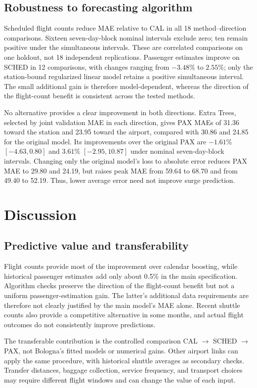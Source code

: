 \documentclass[preprint,12pt,times]{elsarticle}
\begin{document}
\subsection{Robustness to forecasting algorithm}
\label{sec:algorithm_results}
Scheduled flight counts reduce MAE relative to CAL in all 18 method--direction comparisons. Sixteen seven-day-block nominal intervals exclude zero; ten remain positive under the simultaneous intervals. These are correlated comparisons on one holdout, not 18 independent replications. Passenger estimates improve on SCHED in 12 comparisons, with changes ranging from $-3.48$\% to $2.55$\%; only the station-bound regularized linear model retains a positive simultaneous interval. The small additional gain is therefore model-dependent, whereas the direction of the flight-count benefit is consistent across the tested methods.

No alternative provides a clear improvement in both directions. Extra Trees, selected by joint validation MAE in each direction, gives PAX MAEs of 31.36 toward the station and 23.95 toward the airport, compared with 30.86 and 24.85 for the original model. Its improvements over the original PAX are $-1.61$\% $[-4.63,0.80]$ and $3.61$\% $[-2.95,10.87]$ under nominal seven-day-block intervals. Changing only the original model's loss to absolute error reduces PAX MAE to 29.80 and 24.19, but raises peak MAE from 59.64 to 68.70 and from 49.40 to 52.19. Thus, lower average error need not improve surge prediction.

\section{Discussion}
\subsection{Predictive value and transferability}
Flight counts provide most of the improvement over calendar boosting, while historical passenger estimates add only about 0.5\% in the main specification. Algorithm checks preserve the direction of the flight-count benefit but not a uniform passenger-estimation gain. The latter's additional data requirements are therefore not clearly justified by the main model's MAE alone. Recent shuttle counts also provide a competitive alternative in some months, and actual flight outcomes do not consistently improve predictions.

The transferable contribution is the controlled comparison CAL $\rightarrow$ SCHED $\rightarrow$ PAX, not Bologna's fitted models or numerical gains. Other airport links can apply the same procedure, with historical shuttle averages as secondary checks. Transfer distances, baggage collection, service frequency, and transport choices may require different flight windows and can change the value of each input.
\end{document}

